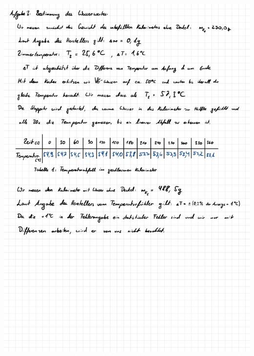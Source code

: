 \documentclass{article}
\begin{document}
\includegraphics[width=\textwidth]{graphics/mess2.jpg}
\newpage
\end{document}
